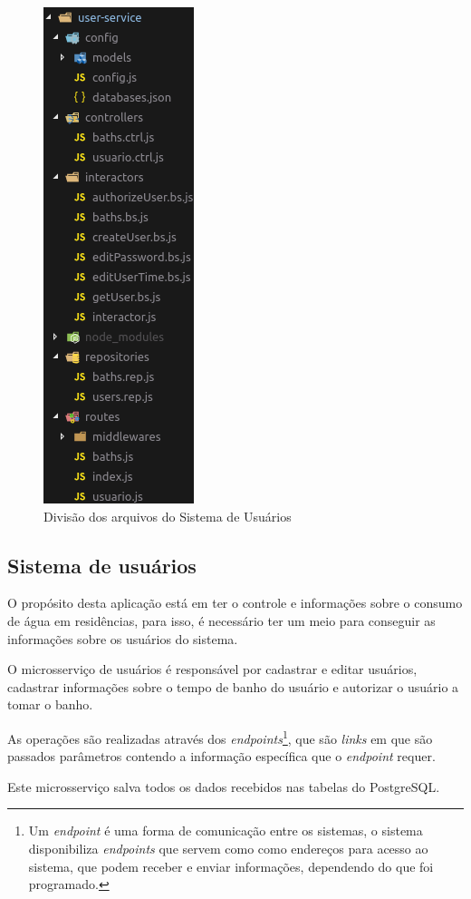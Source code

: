 \begin{figure}[htbp]
	\centering
	\includegraphics[width=0.25\linewidth]{figuras/cleanarch.png}
	\caption{Divisão dos arquivos do Sistema de Usuários}
	\label{fig:clean}
\end{figure}

\subsection{Sistema de usuários} \label{sec:usuarios}

O propósito desta aplicação está em ter o controle e informações sobre o consumo de água em residências, para isso, é necessário ter um meio para conseguir as informações sobre os usuários do sistema. 

O microsserviço de usuários é responsável por cadastrar e editar usuários, cadastrar informações sobre o tempo de banho do usuário e autorizar o usuário a tomar o banho.

As operações são realizadas através dos \textit{endpoints}\footnote{Um \textit{endpoint} é uma forma de comunicação entre os sistemas, o sistema disponibiliza \textit{endpoints} que servem como como endereços para acesso ao sistema, que podem receber e enviar informações, dependendo do que foi programado.}, que são \textit{links} em que são passados parâmetros contendo a informação específica que o \textit{endpoint} requer.

Este microsserviço salva todos os dados recebidos nas tabelas do PostgreSQL.

